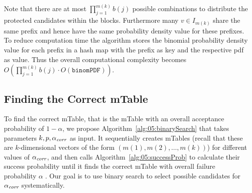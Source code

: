 Note that there are at most $\prod_{j=1}^{m(k)}b(j)$ possible combinations to distribute the protected candidates within the blocks.
%
Furthermore many $v \in I_{m(k)}$ share the same prefix and hence have the same probability density value for these prefixes.
%
To reduce computation time the algorithm stores the binomial probability density value for each prefix in a hash map with the prefix as key and the respective pdf as value.
%
Thus the overall computational complexity becomes $O(\prod_{j=1}^{m(k)}b(j) \cdot O(\texttt{binomPDF}))$.

\subsection{Finding the Correct mTable}\label{subsec:finding-mtable}
To find the correct mTable, that is the mTable with an overall acceptance probability of $1-\alpha$, we propose Algorithm~\ref{alg:05:binarySearch} that takes  parameters $k, p, \alpha_\textit{corr}$ as input.
%
%
It sequentially creates mTables (recall that these are $k$-dimensional vectors of the form $(m(1), m(2), \ldots , m(k))$) for different values of $\alpha_\textit{corr}$, and then calls Algorithm~\ref{alg:05:successProb} to calculate their success probability until it finds the correct mTable with overall failure probability $\alpha$ . Our goal is to use binary search to select possible candidates for $\alpha_\textit{corr}$ systematically.

